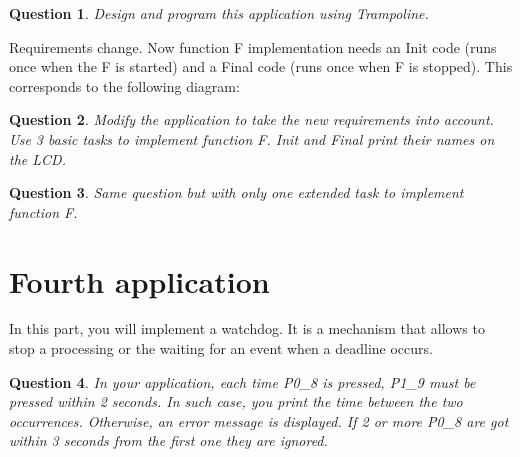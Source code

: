 \documentclass[11pt]{report}
\newtheorem{ex}{Question}
\begin{document}
\begin{ex}
Design and program this application using Trampoline.
\end{ex}

Requirements change. Now function F implementation needs an Init code
(runs once when the F is started) and a Final code (runs once when F is stopped).
This corresponds to the following diagram:

\begin{center}
\begin{adjustbox}{width=14cm,keepaspectratio}
\end{adjustbox}
\end{center}


\begin{ex}
Modify the application to take the new requirements into account. Use 3 basic tasks to implement function F. Init and Final print their names on the LCD.
\end{ex}

\begin{ex}
Same question but with only one extended task to implement function F.
\end{ex}

\section{Fourth application}

In this part, you will implement a watchdog. It is a mechanism that allows to stop a processing or the waiting for an event when a deadline occurs.

\begin{ex}
In your application, each time P0_8 is pressed, P1_9 must be pressed within 2 seconds. In such case, you print the time between the two occurrences. Otherwise, an error message is displayed. If 2 or more P0_8 are got within 3 seconds from the first one they are ignored.
\end{ex}
\end{document}
